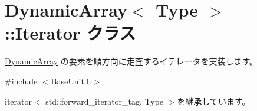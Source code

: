\hypertarget{class_dynamic_array_1_1_iterator}{}\section{Dynamic\+Array$<$ Type $>$\+:\+:Iterator クラス}
\label{class_dynamic_array_1_1_iterator}


\hyperlink{class_dynamic_array}{Dynamic\+Array} の要素を順方向に走査するイテレータを実装します。 




{\ttfamily \#include $<$Base\+Unit.\+h$>$}



iterator$<$ std\+::forward\+\_\+iterator\+\_\+tag, Type $>$を継承しています。

